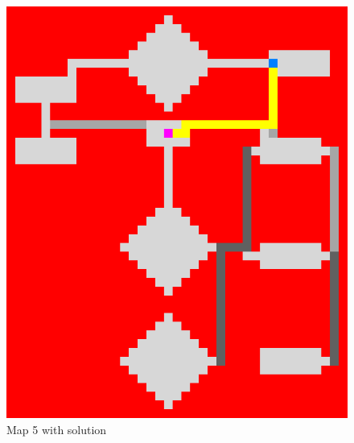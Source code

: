 \documentclass{article}
\begin{document}
\begin{figure}[h]
\begin{minipage}{0.4\textwidth}
		\includegraphics[width=\textwidth]{images/map5_solution}
    		\caption{Map 5 with solution}
	\end{minipage}
\end{figure}
\end{document}
